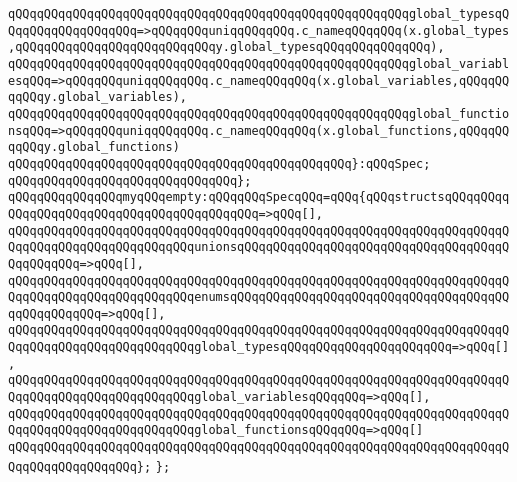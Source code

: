 \verb|qQQqqQQqqQQqqQQqqQQqqQQqqQQqqQQqqQQqqQQqqQQqqQQqqQQqqQQqglobal_typesqQQqqQQqqQQqqQQqqQQq=>qQQqqQQquniqqQQqqQQq.c_nameqQQqqQQq(x.global_types,qQQqqQQqqQQqqQQqqQQqqQQqqQQqy.global_typesqQQqqQQqqQQqqQQq),|\newline
\verb|qQQqqQQqqQQqqQQqqQQqqQQqqQQqqQQqqQQqqQQqqQQqqQQqqQQqqQQqglobal_variablesqQQq=>qQQqqQQquniqqQQqqQQq.c_nameqQQqqQQq(x.global_variables,qQQqqQQqqQQqy.global_variables),|\newline
\verb|qQQqqQQqqQQqqQQqqQQqqQQqqQQqqQQqqQQqqQQqqQQqqQQqqQQqqQQqglobal_functionsqQQq=>qQQqqQQquniqqQQqqQQq.c_nameqQQqqQQq(x.global_functions,qQQqqQQqqQQqy.global_functions)|\newline
\newline
\verb|qQQqqQQqqQQqqQQqqQQqqQQqqQQqqQQqqQQqqQQqqQQqqQQq}:qQQqSpec;|\newline
\verb|qQQqqQQqqQQqqQQqqQQqqQQqqQQqqQQq};|\newline
\newline
\verb|qQQqqQQqqQQqqQQqmyqQQqempty:qQQqqQQqSpecqQQq=qQQq{qQQqstructsqQQqqQQqqQQqqQQqqQQqqQQqqQQqqQQqqQQqqQQqqQQq=>qQQq[],|\newline
\verb|qQQqqQQqqQQqqQQqqQQqqQQqqQQqqQQqqQQqqQQqqQQqqQQqqQQqqQQqqQQqqQQqqQQqqQQqqQQqqQQqqQQqqQQqqQQqqQQqunionsqQQqqQQqqQQqqQQqqQQqqQQqqQQqqQQqqQQqqQQqqQQqqQQq=>qQQq[],|\newline
\verb|qQQqqQQqqQQqqQQqqQQqqQQqqQQqqQQqqQQqqQQqqQQqqQQqqQQqqQQqqQQqqQQqqQQqqQQqqQQqqQQqqQQqqQQqqQQqqQQqenumsqQQqqQQqqQQqqQQqqQQqqQQqqQQqqQQqqQQqqQQqqQQqqQQqqQQq=>qQQq[],|\newline
\verb|qQQqqQQqqQQqqQQqqQQqqQQqqQQqqQQqqQQqqQQqqQQqqQQqqQQqqQQqqQQqqQQqqQQqqQQqqQQqqQQqqQQqqQQqqQQqqQQqglobal_typesqQQqqQQqqQQqqQQqqQQqqQQq=>qQQq[],|\newline
\verb|qQQqqQQqqQQqqQQqqQQqqQQqqQQqqQQqqQQqqQQqqQQqqQQqqQQqqQQqqQQqqQQqqQQqqQQqqQQqqQQqqQQqqQQqqQQqqQQqglobal_variablesqQQqqQQq=>qQQq[],|\newline
\verb|qQQqqQQqqQQqqQQqqQQqqQQqqQQqqQQqqQQqqQQqqQQqqQQqqQQqqQQqqQQqqQQqqQQqqQQqqQQqqQQqqQQqqQQqqQQqqQQqglobal_functionsqQQqqQQq=>qQQq[]|\newline
\verb|qQQqqQQqqQQqqQQqqQQqqQQqqQQqqQQqqQQqqQQqqQQqqQQqqQQqqQQqqQQqqQQqqQQqqQQqqQQqqQQqqQQqqQQq};|\newline
\verb|};|\newline
\newline

